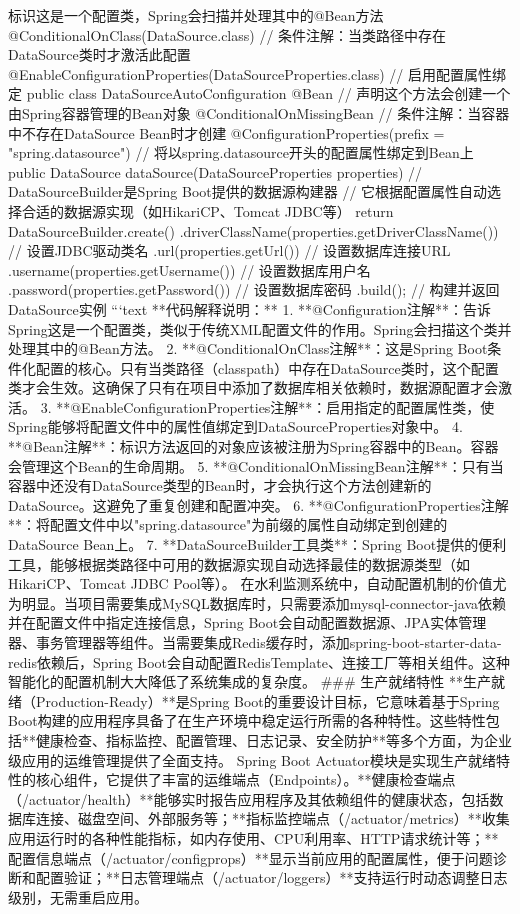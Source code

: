 标识这是一个配置类，Spring会扫描并处理其中的@Bean方法 @ConditionalOnClass(DataSource.class) // 条件注解：当类路径中存在DataSource类时才激活此配置 @EnableConfigurationProperties(DataSourceProperties.class) // 启用配置属性绑定 public class DataSourceAutoConfiguration { @Bean // 声明这个方法会创建一个由Spring容器管理的Bean对象 @ConditionalOnMissingBean // 条件注解：当容器中不存在DataSource Bean时才创建 @ConfigurationProperties(prefix = "spring.datasource") // 将以spring.datasource开头的配置属性绑定到Bean上 public DataSource dataSource(DataSourceProperties properties) { // DataSourceBuilder是Spring Boot提供的数据源构建器 // 它根据配置属性自动选择合适的数据源实现（如HikariCP、Tomcat JDBC等） return DataSourceBuilder.create() .driverClassName(properties.getDriverClassName()) // 设置JDBC驱动类名 .url(properties.getUrl()) // 设置数据库连接URL .username(properties.getUsername()) // 设置数据库用户名 .password(properties.getPassword()) // 设置数据库密码 .build(); // 构建并返回DataSource实例 } } ```text **代码解释说明：** 1. **@Configuration注解**：告诉Spring这是一个配置类，类似于传统XML配置文件的作用。Spring会扫描这个类并处理其中的@Bean方法。 2. **@ConditionalOnClass注解**：这是Spring Boot条件化配置的核心。只有当类路径（classpath）中存在DataSource类时，这个配置类才会生效。这确保了只有在项目中添加了数据库相关依赖时，数据源配置才会激活。 3. **@EnableConfigurationProperties注解**：启用指定的配置属性类，使Spring能够将配置文件中的属性值绑定到DataSourceProperties对象中。 4. **@Bean注解**：标识方法返回的对象应该被注册为Spring容器中的Bean。容器会管理这个Bean的生命周期。 5. **@ConditionalOnMissingBean注解**：只有当容器中还没有DataSource类型的Bean时，才会执行这个方法创建新的DataSource。这避免了重复创建和配置冲突。 6. **@ConfigurationProperties注解**：将配置文件中以"spring.datasource"为前缀的属性自动绑定到创建的DataSource Bean上。 7. **DataSourceBuilder工具类**：Spring Boot提供的便利工具，能够根据类路径中可用的数据源实现自动选择最佳的数据源类型（如HikariCP、Tomcat JDBC Pool等）。 在水利监测系统中，自动配置机制的价值尤为明显。当项目需要集成MySQL数据库时，只需要添加mysql-connector-java依赖并在配置文件中指定连接信息，Spring Boot会自动配置数据源、JPA实体管理器、事务管理器等组件。当需要集成Redis缓存时，添加spring-boot-starter-data-redis依赖后，Spring Boot会自动配置RedisTemplate、连接工厂等相关组件。这种智能化的配置机制大大降低了系统集成的复杂度。 ### 生产就绪特性 **生产就绪（Production-Ready）**是Spring Boot的重要设计目标，它意味着基于Spring Boot构建的应用程序具备了在生产环境中稳定运行所需的各种特性。这些特性包括**健康检查、指标监控、配置管理、日志记录、安全防护**等多个方面，为企业级应用的运维管理提供了全面支持。 Spring Boot Actuator模块是实现生产就绪特性的核心组件，它提供了丰富的运维端点（Endpoints）。**健康检查端点（/actuator/health）**能够实时报告应用程序及其依赖组件的健康状态，包括数据库连接、磁盘空间、外部服务等；**指标监控端点（/actuator/metrics）**收集应用运行时的各种性能指标，如内存使用、CPU利用率、HTTP请求统计等；**配置信息端点（/actuator/configprops）**显示当前应用的配置属性，便于问题诊断和配置验证；**日志管理端点（/actuator/loggers）**支持运行时动态调整日志级别，无需重启应用。 